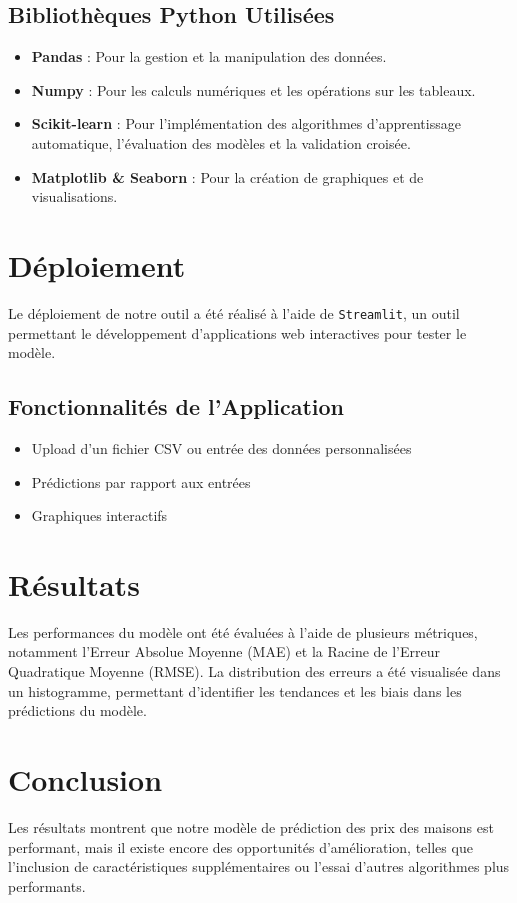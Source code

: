 \documentclass{article}
\begin{document}
\subsection{Bibliothèques Python Utilisées}
\begin{itemize}
   \item \textbf{Pandas} : Pour la gestion et la manipulation des données.
   \item \textbf{Numpy} : Pour les calculs numériques et les opérations sur les tableaux.
   \item \textbf{Scikit-learn} : Pour l'implémentation des algorithmes d’apprentissage automatique, l’évaluation des modèles et la validation croisée.
   \item \textbf{Matplotlib \& Seaborn} : Pour la création de graphiques et de visualisations.
\end{itemize}
 
\section{Déploiement}
Le déploiement de notre outil a été réalisé à l’aide de \texttt{Streamlit}, un outil permettant le développement d’applications web interactives pour tester le modèle.
 
\subsection{Fonctionnalités de l’Application}
\begin{itemize}
   \item Upload d’un fichier CSV ou entrée des données personnalisées
   \item Prédictions par rapport aux entrées
   \item Graphiques interactifs
\end{itemize}
 
\section{Résultats}
Les performances du modèle ont été évaluées à l'aide de plusieurs métriques, notamment l'Erreur Absolue Moyenne (MAE) et la Racine de l'Erreur Quadratique Moyenne (RMSE). La distribution des erreurs a été visualisée dans un histogramme, permettant d'identifier les tendances et les biais dans les prédictions du modèle.
 
\section{Conclusion}
Les résultats montrent que notre modèle de prédiction des prix des maisons est performant, mais il existe encore des opportunités d'amélioration, telles que l'inclusion de caractéristiques supplémentaires ou l'essai d'autres algorithmes plus performants.
 
\end{document}
